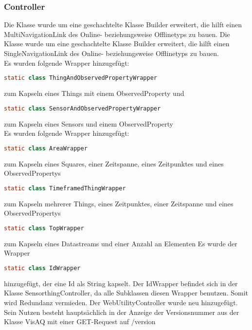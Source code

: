 \subsubsection{Controller}
\noChange
{}
Die Klasse wurde um eine geschachtelte Klasse Builder erweitert, die hilft einen MultiNavigationLink des Online- beziehungsweise Offlinetyps zu bauen.
\noChange
{}
\noChange
{}
\noChange
{}
Die Klasse wurde um eine geschachtelte Klasse Builder erweitert, die hilft einen SingleNavigationLink des Online- beziehungsweise Offlinetyps zu bauen.
\noChange
\controllerWrapper
\\
Es wurden folgende Wrapper hinzugefügt:
\begin{lstlisting}[language=java]
    static class ThingAndObservedPropertyWrapper
\end{lstlisting}
zum Kapseln eines Things mit einem ObservedProperty
und 
\begin{lstlisting}[language=java]
    static class SensorAndObservedPropertyWrapper
\end{lstlisting}
zum Kapseln eines Sensors und einem ObservedProperty
\controllerWrapper
{}
\controllerWrapper
{}
\controllerWrapper
{}
\controllerWrapper
\\
Es wurden folgende Wrapper hinzugefügt:
\begin{lstlisting}[language=java]
    static class AreaWrapper
\end{lstlisting}
zum Kapseln eines Squares, einer Zeitspanne, eines Zeitpunktes und eines ObservedPropertys
\begin{lstlisting}[language=java]
    static class TimeframedThingWrapper
\end{lstlisting}
zum Kapseln mehrerer Things, eines Zeitpunktes, einer Zeitspanne und eines ObservedPropertys
\begin{lstlisting}[language=java]
    static class TopWrapper
\end{lstlisting}
zum Kapseln eines Datastreams und einer Anzahl an Elementen
\controllerWrapper
{}
\controllerWrapper
{}
Es wurde der Wrapper
\begin{lstlisting}[language=java]
    static class IdWrapper
\end{lstlisting}
hinzugefügt, der eine Id als String kapselt.
Der IdWrapper befindet sich in der Klasse SensorthingController, da alle Subklassen diesen Wrapper benutzen.
Somit wird Redundanz vermieden.
\controllerWrapper
{}
\controllerWrapper
{}
Der WebUtilityController wurde neu hinzugefügt. Sein Nutzen besteht hauptsächlich in der Anzeige der Versionsnummer aus der Klasse VisAQ mit einer GET-Request auf /version

